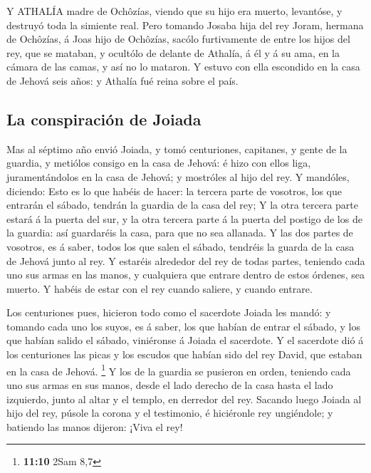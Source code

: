  Y ATHALÍA madre de Ochôzías, viendo que su hijo era muerto,
levantóse, y destruyó toda la simiente real.  Pero tomando
Josaba hija del rey Joram, hermana de Ochôzías, á Joas hijo de Ochôzías,
sacólo furtivamente de entre los hijos del rey, que se mataban, y
ocultólo de delante de Athalía, á él y á su ama, en la cámara de las
camas, y así no lo mataron.  Y estuvo con ella escondido en
la casa de Jehová seis años: y Athalía fué reina sobre el país.

\hypertarget{la-conspiraciuxf3n-de-joiada}{%
\subsection{La conspiración de
Joiada}\label{la-conspiraciuxf3n-de-joiada}}

 Mas al séptimo año envió Joiada, y tomó centuriones,
capitanes, y gente de la guardia, y metiólos consigo en la casa de
Jehová: é hizo con ellos liga, juramentándolos en la casa de Jehová; y
mostróles al hijo del rey.  Y mandóles, diciendo: Esto es lo
que habéis de hacer: la tercera parte de vosotros, los que entrarán el
sábado, tendrán la guardia de la casa del rey;  Y la otra
tercera parte estará á la puerta del sur, y la otra tercera parte á la
puerta del postigo de los de la guardia: así guardaréis la casa, para
que no sea allanada.  Y las dos partes de vosotros, es á
saber, todos los que salen el sábado, tendréis la guarda de la casa de
Jehová junto al rey.  Y estaréis alrededor del rey de todas
partes, teniendo cada uno sus armas en las manos, y cualquiera que
entrare dentro de estos órdenes, sea muerto. Y habéis de estar con el
rey cuando saliere, y cuando entrare.

 Los centuriones pues, hicieron todo como el sacerdote
Joiada les mandó: y tomando cada uno los suyos, es á saber, los que
habían de entrar el sábado, y los que habían salido el sábado,
viniéronse á Joiada el sacerdote.  Y el sacerdote dió á los
centuriones las picas y los escudos que habían sido del rey David, que
estaban en la casa de Jehová. \footnote{\textbf{11:10} 2Sam 8,7}
 Y los de la guardia se pusieron en orden, teniendo cada
uno sus armas en sus manos, desde el lado derecho de la casa hasta el
lado izquierdo, junto al altar y el templo, en derredor del rey.
 Sacando luego Joiada al hijo del rey, púsole la corona y
el testimonio, é hiciéronle rey ungiéndole; y batiendo las manos
dijeron: ¡Viva el rey!

